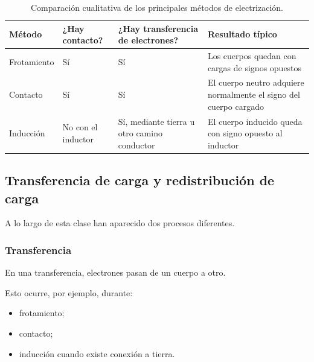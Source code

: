 \begin{table}[H]
    \centering

    \caption{Comparación cualitativa de los principales métodos de
    electrización.}

    \begin{tabularx}{\textwidth}{lYYY}
        \toprule
        Método
        &
        ¿Hay contacto?
        &
        ¿Hay transferencia de electrones?
        &
        Resultado típico
        \\
        \midrule

        Frotamiento
        &
        Sí
        &
        Sí
        &
        Los cuerpos quedan con cargas de signos opuestos
        \\

        Contacto
        &
        Sí
        &
        Sí
        &
        El cuerpo neutro adquiere normalmente el signo del cuerpo cargado
        \\

        Inducción
        &
        No con el inductor
        &
        Sí, mediante tierra u otro camino conductor
        &
        El cuerpo inducido queda con signo opuesto al inductor
        \\

        \bottomrule
    \end{tabularx}

\end{table}



\subsection{Transferencia de carga y redistribución de carga}

A lo largo de esta clase han aparecido dos procesos diferentes.

\subsubsection{Transferencia}

En una transferencia, electrones pasan de un cuerpo a otro.

Esto ocurre, por ejemplo, durante:

\begin{itemize}
    \item frotamiento;
    \item contacto;
    \item inducción cuando existe conexión a tierra.
\end{itemize}


